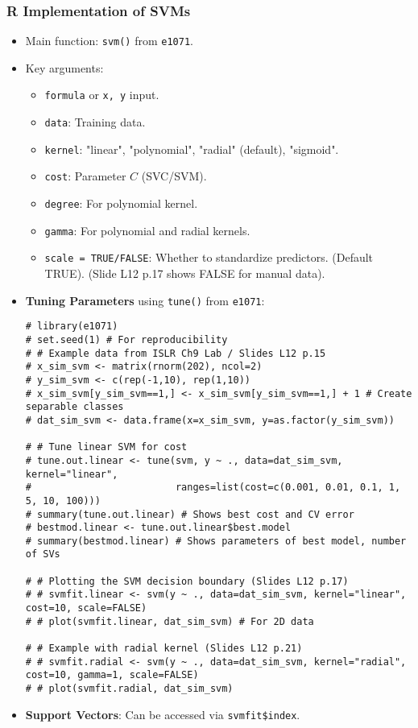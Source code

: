 \documentclass[12pt,a4paper]{article}
\newcommand{\Rpackage}[1]{\texttt{#1}} %
\newcommand{\Rfunction}[1]{\texttt{#1()}} %
\newcommand{\Rcode}[1]{\texttt{#1}} %
\begin{document}
    \subsubsection{R Implementation of SVMs}
        \begin{itemize}
            \item Main function: \Rfunction{svm} from \Rpackage{e1071}.
            \item Key arguments:
                \begin{itemize}
                    \item \Rcode{formula} or \Rcode{x, y} input.
                    \item \Rcode{data}: Training data.
                    \item \Rcode{kernel}: "linear", "polynomial", "radial" (default), "sigmoid".
                    \item \Rcode{cost}: Parameter $C$ (SVC/SVM).
                    \item \Rcode{degree}: For polynomial kernel.
                    \item \Rcode{gamma}: For polynomial and radial kernels.
                    \item \Rcode{scale = TRUE/FALSE}: Whether to standardize predictors. (Default TRUE). (Slide L12 p.17 shows FALSE for manual data).
                \end{itemize}
            \item \textbf{Tuning Parameters} using \Rfunction{tune} from \Rpackage{e1071}:
\begin{lstlisting}[caption={Tuning SVM with e1071::tune (ISLR Ch9 Lab, Ex 9.7)}]
# library(e1071)
# set.seed(1) # For reproducibility
# # Example data from ISLR Ch9 Lab / Slides L12 p.15
# x_sim_svm <- matrix(rnorm(202), ncol=2)
# y_sim_svm <- c(rep(-1,10), rep(1,10))
# x_sim_svm[y_sim_svm==1,] <- x_sim_svm[y_sim_svm==1,] + 1 # Create separable classes
# dat_sim_svm <- data.frame(x=x_sim_svm, y=as.factor(y_sim_svm))

# # Tune linear SVM for cost
# tune.out.linear <- tune(svm, y ~ ., data=dat_sim_svm, kernel="linear",
#                         ranges=list(cost=c(0.001, 0.01, 0.1, 1, 5, 10, 100)))
# summary(tune.out.linear) # Shows best cost and CV error
# bestmod.linear <- tune.out.linear$best.model
# summary(bestmod.linear) # Shows parameters of best model, number of SVs

# # Plotting the SVM decision boundary (Slides L12 p.17)
# # svmfit.linear <- svm(y ~ ., data=dat_sim_svm, kernel="linear", cost=10, scale=FALSE)
# # plot(svmfit.linear, dat_sim_svm) # For 2D data

# # Example with radial kernel (Slides L12 p.21)
# # svmfit.radial <- svm(y ~ ., data=dat_sim_svm, kernel="radial", cost=10, gamma=1, scale=FALSE)
# # plot(svmfit.radial, dat_sim_svm)
\end{lstlisting}
            \item \textbf{Support Vectors}: Can be accessed via \Rcode{svmfit\$index}.
        \end{itemize}
\end{document}
